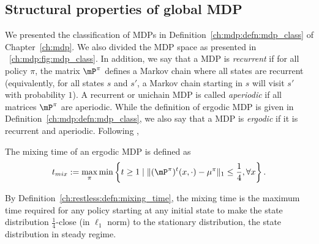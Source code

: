 

\subsection{Structural properties of global MDP}
\label{ssec:mdp_params}

We presented the classification of MDPs in Definition~\ref{ch:mdp:defn:mdp_class} of Chapter~\ref{ch:mdp}.
We also divided the MDP space as presented in \figurename~\ref{ch:mdp:fig:mdp_class}.
In addition, we say that a MDP is \emph{recurrent} if for all policy $\pi$, the matrix $\mP^\pi$ defines a Markov chain where all states are recurrent (equivalently, for all states $s$ and $s'$, a Markov chain starting in $s$ will visit $s'$ with probability $1$).
A recurrent or unichain MDP is called \emph{aperiodic} if all matrices $\mP^\pi$ are aperiodic.
While the definition of ergodic MDP is given in Definition~\ref{ch:mdp:defn:mdp_class}, we also say that a MDP is \emph{ergodic} if it is recurrent and aperiodic.
Following \cite[Definition 5.1]{wei2020model},
\begin{defn}
    \label{ch:restless:defn:mixing_time}
    The mixing time of an ergodic MDP is defined as
    \begin{align*}
        t_{mix} := \max_{\pi}\min\left\{ t\ge1 \mid \lVert (\mP^\pi)^t(x,\cdot) - \mu^\pi\rVert_1 \le \frac14, \forall x\right\}.
    \end{align*}
\end{defn}
By Definition~\ref{ch:restless:defn:mixing_time}, the mixing time is the maximum time required for any policy starting at any initial state to make the state distribution $\frac14$-close (in $\ell_1$ norm) to the stationary distribution, the state distribution in steady regime.

